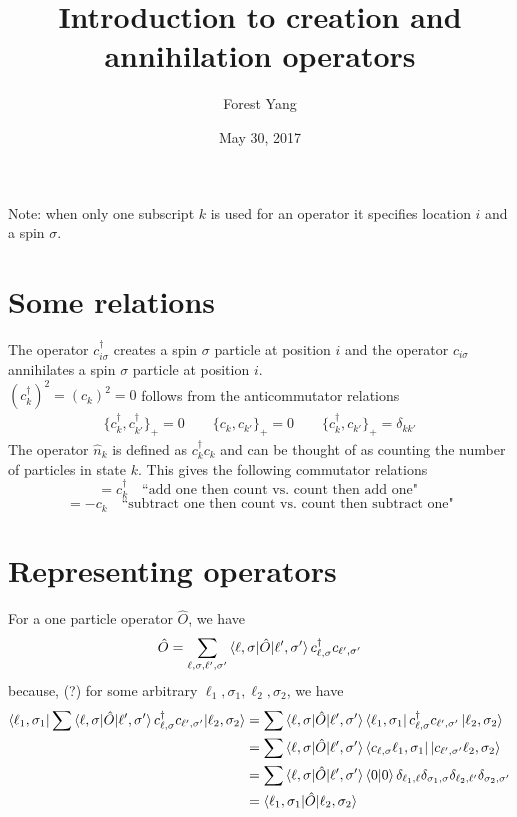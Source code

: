 \documentclass{article}
\title{Introduction to creation and annihilation operators}
\author{Forest Yang}
\date{May 30, 2017}
\begin{document}
\maketitle
Note: when only one subscript $k$ is used for an operator it specifies location $i$ and a spin $\sigma$.
\section{Some relations}
The operator $c_{i\sigma}^\dagger$ creates a spin $\sigma$ particle at position $i$ and the operator $c_{i\sigma}$ annihilates a spin $\sigma$ particle at position $i$. \\
$(c_k^{\dagger})^2 = (c_k)^2 = 0$ follows from the anticommutator relations 
\begin{gather*}
\{c_k^{\dagger}, c_{k'}^{\dagger}\}_{+} = 0 \qquad \{c_k , c_{k'}\}_+ = 0 \qquad \{c_k^{\dagger}, c_{k'}\}_+ = \delta_{kk'}
\end{gather*}
The operator $\hat{n}_k$ is defined as $c_k^{\dagger} c_k$ and can be thought of as counting the number of particles in state $k$. This gives the following commutator relations \\
\begin{equation*} [\hat{n}_k, c_k^{\dagger}] = c_k^{\dagger} \quad \text{``add one then count vs. count then add one" } \end{equation*}
\begin{equation*} [\hat{n}_k, c_k] = -c_k\quad  \text{``subtract one then count vs. count then subtract one"} \end{equation*}
\section{Representing operators}
For a one particle operator $\hat{O}$, we have \begin{equation*} \hat{O} = \sum_{\ell, \sigma, \ell ', \sigma '}\braket{\ell, \sigma| \hat{O} | \ell ' , \sigma '} c_{\ell, \sigma}^{\dagger} c_{\ell', \sigma'} \end{equation*}
because, (?) for some arbitrary $\ell_1, \sigma_1, \ell_2, \sigma_2$, we have 
\begin{align*}
\braket{\ell_1, \sigma_1 | \sum \braket{\ell, \sigma| \hat{O} | \ell ' , \sigma '} c_{\ell, \sigma}^{\dagger} c_{\ell', \sigma'} | \ell_2, \sigma_2} &= \sum \braket{\ell, \sigma| \hat{O} | \ell ' , \sigma '} \bra{\ell_1, \sigma_1} c_{\ell, \sigma}^{\dagger} c_{\ell', \sigma'} \ket{\ell_2, \sigma_2} \\
&= \sum \braket{\ell, \sigma| \hat{O} | \ell ' , \sigma '} \bra{c_{\ell, \sigma} \ell_1, \sigma_1}  \ket{ c_{\ell', \sigma'} \ell_2, \sigma_2} \\
&= \sum \braket{\ell, \sigma| \hat{O} | \ell ' , \sigma '} \braket{0 | 0} \delta_{\ell_1, \ell} \delta_{\sigma_1, \sigma} \delta_{\ell_2, \ell'} \delta_{\sigma_2, \sigma'} \\
&= \braket{\ell_1, \sigma_1 | \hat{O} | \ell_2, \sigma_2}
\end{align*}
\end{document}
